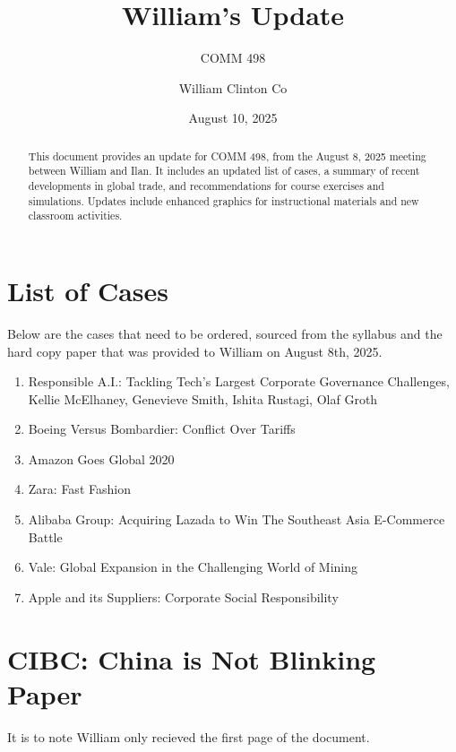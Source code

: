 \documentclass[
  11pt,
]{article}
\title{William's Update}
\subtitle{COMM 498}
\author{William Clinton Co}
\date{August 10, 2025}
\renewcommand*\contentsname{Table of contents}
\newcommand\contentsname{Table of contents}
\begin{document}
\maketitle
\begin{abstract}
This document provides an update for COMM 498, from the August 8, 2025
meeting between William and Ilan. It includes an updated list of cases,
a summary of recent developments in global trade, and recommendations
for course exercises and simulations. Updates include enhanced graphics
for instructional materials and new classroom activities.
\end{abstract}

\renewcommand*\contentsname{Table of contents}
{
\hypersetup{linkcolor=}
\setcounter{tocdepth}{3}
\tableofcontents
}

\section{List of Cases}\label{list-of-cases}

Below are the cases that need to be ordered, sourced from the syllabus
and the hard copy paper that was provided to William on August 8th,
2025.

\begin{enumerate}
\def\labelenumi{\arabic{enumi}.}
\item
  Responsible A.I.: Tackling Tech's Largest Corporate Governance
  Challenges, Kellie McElhaney, Genevieve Smith, Ishita Rustagi, Olaf
  Groth
\item
  Boeing Versus Bombardier: Conflict Over Tariffs
\item
  Amazon Goes Global 2020
\item
  Zara: Fast Fashion
\item
  Alibaba Group: Acquiring Lazada to Win The Southeast Asia E-Commerce
  Battle
\item
  Vale: Global Expansion in the Challenging World of Mining
\item
  Apple and its Suppliers: Corporate Social Responsibility
\end{enumerate}

\section{CIBC: China is Not Blinking
Paper}\label{cibc-china-is-not-blinking-paper}

It is to note William only recieved the first page of the document.
\end{document}

